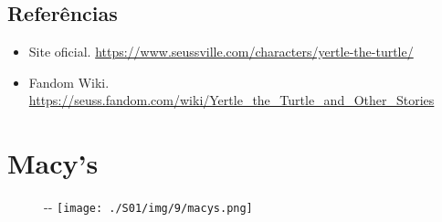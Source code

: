 \hypertarget{referuxeancias}{%
\subsection{Referências}\label{referuxeancias}}

\begin{itemize}
\tightlist
\item
  \sloppy Site oficial. \url{https://www.seussville.com/characters/yertle-the-turtle/}
\item
  \sloppy Fandom Wiki. \url{https://seuss.fandom.com/wiki/Yertle_the_Turtle_and_Other_Stories}
\end{itemize}

\hypertarget{macys}{%
\section{Macy's}\label{macys}}

\begin{figure}[!ht]
  \begin{adjustwidth}{-\oddsidemargin-1in}{-\rightmargin}
    \centering
    \texttt{[image: ./S01/img/9/macys.png]}
  \end{adjustwidth}
\end{figure}

